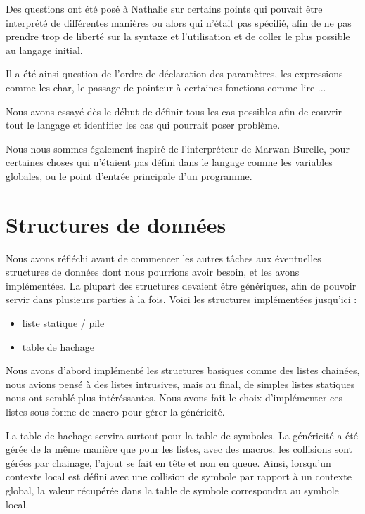 \documentclass[12pt,a4paper]{report}
\begin{document}
Des questions ont été posé à Nathalie sur certains points qui pouvait être interprété de différentes manières ou alors qui n'était pas spécifié, afin de ne pas prendre trop de liberté sur la syntaxe et l'utilisation et de coller le plus possible au langage initial.

Il a été ainsi question de l'ordre de déclaration des paramètres, les expressions comme les char, le passage de pointeur à certaines fonctions comme lire ... 

Nous avons essayé dès le début de définir tous les cas possibles afin de couvrir tout le langage et identifier les cas qui pourrait poser problème.

Nous nous sommes également inspiré de l'interpréteur de Marwan Burelle, pour certaines choses qui n'étaient pas défini dans le langage comme les variables globales, ou le point d'entrée principale d'un programme.
\newpage

\section{Structures de données}
Nous avons réfléchi avant de  commencer les autres tâches aux éventuelles structures de données dont nous pourrions avoir besoin, et les avons implémentées. La plupart des structures devaient être génériques, afin de pouvoir servir dans plusieurs parties à la fois. Voici les structures implémentées jusqu'ici :\\

\begin{itemize}
\item liste statique / pile
\item table de hachage
\end{itemize}

Nous avons d'abord implémenté les structures basiques comme des listes chainées, nous avions pensé à des listes intrusives, mais au final, de simples listes statiques nous ont semblé plus intéréssantes. Nous avons fait le choix d'implémenter ces listes sous forme de macro pour gérer la généricité. 

La table de hachage servira surtout pour la table de symboles. La généricité a été gérée de la même manière que pour les listes, avec des macros. les collisions sont gérées par chainage, l'ajout se fait en tête et non en queue. Ainsi, lorsqu'un contexte local est défini avec une collision de symbole par rapport à un contexte global, la valeur récupérée dans la table de symbole correspondra au symbole local.\\
\end{document}
